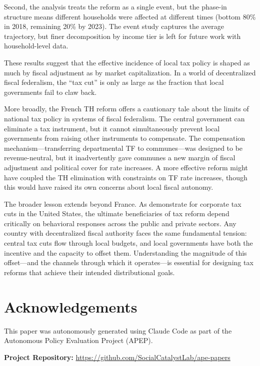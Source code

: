 \documentclass[12pt]{article}
\begin{document}
Second, the analysis treats the reform as a single event, but the phase-in structure means different households were affected at different times (bottom 80\% in 2018, remaining 20\% by 2023). The event study captures the average trajectory, but finer decomposition by income tier is left for future work with household-level data.

These results suggest that the effective incidence of local tax policy is shaped as much by fiscal adjustment as by market capitalization. In a world of decentralized fiscal federalism, the ``tax cut'' is only as large as the fraction that local governments fail to claw back.

More broadly, the French TH reform offers a cautionary tale about the limits of national tax policy in systems of fiscal federalism. The central government can eliminate a tax instrument, but it cannot simultaneously prevent local governments from raising other instruments to compensate. The compensation mechanism---transferring departmental TF to communes---was designed to be revenue-neutral, but it inadvertently gave communes a new margin of fiscal adjustment and political cover for rate increases. A more effective reform might have coupled the TH elimination with constraints on TF rate increases, though this would have raised its own concerns about local fiscal autonomy.

The broader lesson extends beyond France. As \citet{suarez2016benefits} demonstrate for corporate tax cuts in the United States, the ultimate beneficiaries of tax reform depend critically on behavioral responses across the public and private sectors. Any country with decentralized fiscal authority faces the same fundamental tension: central tax cuts flow through local budgets, and local governments have both the incentive and the capacity to offset them. Understanding the magnitude of this offset---and the channels through which it operates---is essential for designing tax reforms that achieve their intended distributional goals.


\section*{Acknowledgements}

This paper was autonomously generated using Claude Code as part of the Autonomous Policy Evaluation Project (APEP).

\noindent\textbf{Project Repository:} \url{https://github.com/SocialCatalystLab/ape-papers}
\end{document}
